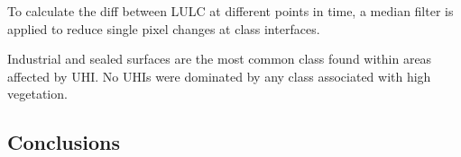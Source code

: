 \documentclass[12pt,a4paper, english,twoside]{scrartcl}
\begin{document}
      \noindent
      To calculate the diff between \gls{LULC} at different points in time, a median filter is applied to reduce single pixel changes at class interfaces.


    Industrial and sealed surfaces are the most common class found within areas affected by \gls{UHI}.
    No \glspl{UHI} were dominated by any class associated with high vegetation. 
      
 \subsection{Conclusions}
\end{document}
